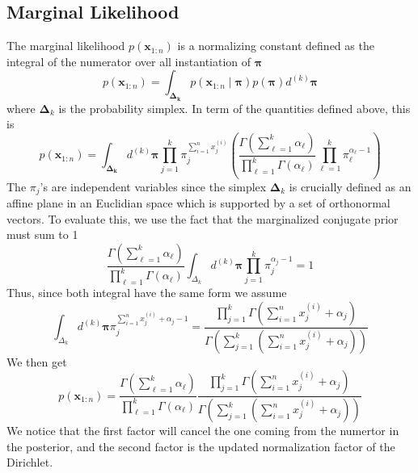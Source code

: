 \documentclass{article}
\newcommand{\s}{\hspace{0.1cm}}
\numberwithin{equation}{section}
\begin{document}
\subsection{Marginal Likelihood}
 The marginal likelihood $p(\mathbf{x}_{1:n})$ 
is a normalizing constant defined as the 
integral of the numerator over all instantiation of $\bm{ \pi} $
\[
        p(\mathbf{x}_{1:n}) = \int_{\bm{ \Delta_k}} 
        p(\mathbf{x}_{1:n} \mid \bm{ \pi})  p(\bm{ \pi} )d^{(k)}\bm{ \pi}  
\]
where $\bm{ \Delta}_k $ is the probability simplex. In term of the quantities 
defined above, this is
\[
         p(\mathbf{x}_{1:n}) = \int_{\bm{ \Delta_k}} 
         d^{(k)}\bm{ \pi} 
         \prod_{j = 1}^k \pi_j^{\sum_{i =1}^n x_j^{(i)}}
        \left( 
         \frac{\Gamma ( \sum _{\ell = 1}^k \alpha_\ell) }{\prod_{\ell=1}^k \Gamma(\alpha_\ell)} 
         \prod_{\ell = 1}^k \pi_\ell^{\alpha_\ell - 1}
        \right) 
\]
The $\pi_j$'s are independent variables since the simplex $\bm{ \Delta}_k $ is crucially 
defined as an affine plane in an Euclidian space which is supported by 
a set of orthonormal vectors.
To evaluate this, we use the fact that the marginalized conjugate prior must sum to 1
\[
        \frac{\Gamma ( \sum _{\ell = 1}^k \alpha_\ell) }{\prod_{\ell=1}^k \Gamma(\alpha_\ell)} 
        \int_{\Delta_k} d^{(k)}\bm{ \pi} \prod_{j =1}^k \pi_j^{\alpha_j - 1} = 1
\]
Thus, since both integral have the same form we assume
\[
\int_{\Delta_k} d^{(k)}\bm{ \pi}  \pi_j^{\sum_{i = 1}^n x_j^{(i)} + \alpha_j - 1}
        =
        \frac{\prod_{j = 1}^k \Gamma(\sum_{i = 1}^n x_j^{(i)} + \alpha_j)}{
        \Gamma\left(\sum_{j = 1}^k \left( \sum_{i = 1}^n x_j^{(i)} + \alpha_j \right) \right)}
\]
We then get
\[
        \boxed{p(\mathbf{x}_{1:n}) = 
         \frac{\Gamma ( \sum _{\ell = 1}^k \alpha_\ell) }{\prod_{\ell=1}^k \Gamma(\alpha_\ell)} 
        \frac{\prod_{j = 1}^k \Gamma(\sum_{i = 1}^n x_j^{(i)} + \alpha_j)}{
        \Gamma\left(\sum_{j = 1}^k \left( \sum_{i = 1}^n x_j^{(i)} + \alpha_j \right) \right)}
}
\]
We notice that the first factor will cancel the one coming from the numertor in the 
posterior, and the second factor is the updated normalization factor of the Dirichlet.
\end{document}
